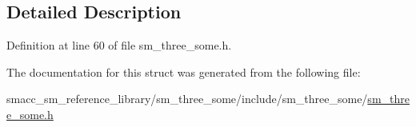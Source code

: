 \subsection{Detailed Description}


Definition at line 60 of file sm\+\_\+three\+\_\+some.\+h.



The documentation for this struct was generated from the following file\+:\begin{DoxyCompactItemize}
\item 
smacc\+\_\+sm\+\_\+reference\+\_\+library/sm\+\_\+three\+\_\+some/include/sm\+\_\+three\+\_\+some/\hyperlink{sm__three__some_8h}{sm\+\_\+three\+\_\+some.\+h}\end{DoxyCompactItemize}
